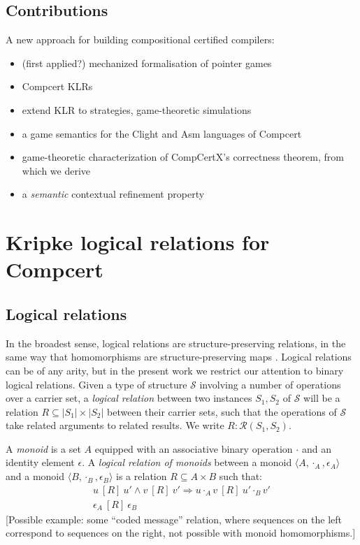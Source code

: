 \documentclass[acmsmall,anonymous]{acmart}
\newcommand{\ifr}[1]{\ [{#1}]\ }
\begin{document}
\subsection{Contributions}

A new approach for building compositional certified compilers:
\begin{itemize}
\item (first applied?) mechanized formalisation of pointer games
\item Compcert KLRs
\item extend KLR to strategies, game-theoretic simulations
\item a game semantics for the Clight and Asm languages of Compcert
\item game-theoretic characterization of CompCertX's correctness theorem, from which we derive
\item a \emph{semantic} contextual refinement property
\end{itemize}


\newpage
\section{Kripke logical relations for Compcert} %


\subsection{Logical relations} %

In the broadest sense,
logical relations are structure-preserving relations,
in the same way that homomorphisms are structure-preserving maps
\citep{lrp}.
Logical relations can be of any arity,
but in the present work
we restrict our attention to
binary logical relations.
Given a type of structure $\mathcal{S}$
involving a number of operations over a carrier set,
a \emph{logical relation}
between two instances $S_1, S_2$ of $\mathcal{S}$
will be a relation $R \subseteq |S_1| \times |S_2|$
between their carrier sets,
such that the operations of $\mathcal{S}$
take related arguments to related results.
We write $R : \mathcal{R}(S_1, S_2)$.

\begin{example}
A \emph{monoid} is a set $A$ equipped with
an associative binary operation $\cdot$ and
an identity element $\epsilon$.
A \emph{logical relation of monoids} between
a monoid $\langle A, \cdot_A, \epsilon_A \rangle$ and
a monoid $\langle B, \cdot_B, \epsilon_B \rangle$
is a relation $R \subseteq A \times B$
such that:
\begin{gather*}
u \ifr{R} u' \wedge v \ifr{R} v' \Rightarrow u \cdot_A v \ifr{R} u' \cdot_B v' \\
\epsilon_A \ifr{R} \epsilon_B
\end{gather*}
[Possible example: some ``coded message'' relation,
where sequences on the left correspond to sequences on the right,
not possible with monoid homomorphisms.]
\end{example}
\end{document}
